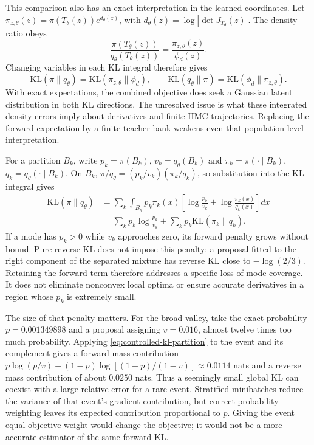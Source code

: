 This comparison also has an exact interpretation in the learned coordinates.
Let $\pi_{z,\theta}(z)=\pi(T_\theta(z))e^{d_\theta(z)}$, with
$d_\theta(z)=\log|\det J_{T_\theta}(z)|$. The density ratio obeys
\begin{equation}
 \frac{\pi(T_\theta(z))}{q_\theta(T_\theta(z))}
 =\frac{\pi_{z,\theta}(z)}{\phi_d(z)}.
\end{equation}
Changing variables in each KL integral therefore gives
\begin{equation}
 \mathrm{KL}(\pi\|q_\theta)
 =\mathrm{KL}(\pi_{z,\theta}\|\phi_d),\qquad
 \mathrm{KL}(q_\theta\|\pi)
 =\mathrm{KL}(\phi_d\|\pi_{z,\theta}).
 \label{eq:controlled-latent-kl}
\end{equation}
With exact expectations, the combined objective does seek a Gaussian latent
distribution in both KL directions. The unresolved issue is what these
integrated density errors imply about derivatives and finite HMC trajectories.
Replacing the forward expectation by a finite teacher bank weakens even that
population-level interpretation.

For a partition $B_k$, write $p_k=\pi(B_k)$, $v_k=q_\theta(B_k)$ and
$\pi_k=\pi(\cdot\mid B_k)$, $q_k=q_\theta(\cdot\mid B_k)$. On $B_k$,
$\pi/q_\theta=(p_k/v_k)(\pi_k/q_k)$, so substitution into the KL integral
gives
\begin{align}
 \mathrm{KL}(\pi\|q_\theta)
 &=\sum_k\int_{B_k}p_k\pi_k(x)
       \left[\log\frac{p_k}{v_k}+\log\frac{\pi_k(x)}{q_k(x)}\right]dx\\
 &=\sum_kp_k\log\frac{p_k}{v_k}
       +\sum_kp_k\mathrm{KL}(\pi_k\|q_k).
 \label{eq:controlled-kl-partition}
\end{align}
If a mode has $p_k>0$ while $v_k$ approaches zero, its forward penalty grows
without bound. Pure reverse KL does not impose this penalty: a proposal fitted
to the right component of the separated mixture has reverse KL close to
$-\log(2/3)$. Retaining the forward term therefore addresses a specific loss
of mode coverage. It does not eliminate nonconvex local optima or ensure
accurate derivatives in a region whose $p_k$ is extremely small.

The size of that penalty matters. For the broad valley, take the exact
probability $p=0.001349898$ and a proposal assigning $v=0.016$, almost twelve
times too much probability. Applying \eqref{eq:controlled-kl-partition} to the
event and its complement gives a forward mass contribution
$p\log(p/v)+(1-p)\log[(1-p)/(1-v)]\approx0.0114$ nats and a reverse mass
contribution of about $0.0250$ nats. Thus a seemingly small global KL can
coexist with a large relative error for a rare event. Stratified minibatches
reduce the variance of that event's gradient contribution, but correct
probability weighting leaves its expected contribution proportional to $p$.
Giving the event equal objective weight would change the objective; it would
not be a more accurate estimator of the same forward KL.

